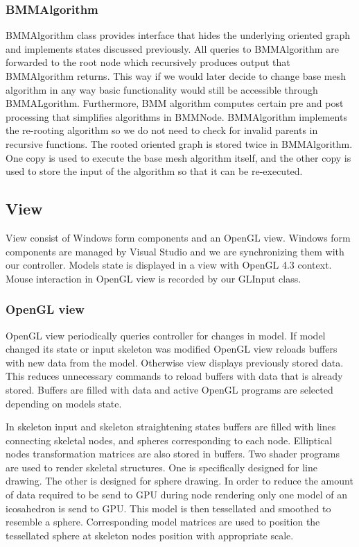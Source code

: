 \subsubsection{BMMAlgorithm}

BMMAlgorithm class provides interface that hides the underlying oriented graph and implements states discussed previously.
All queries to BMMAlgorithm are forwarded to the root node which recursively produces output that BMMAlgorithm returns.
This way if we would later decide to change base mesh algorithm in any way basic functionality would still be accessible through BMMALgorithm.
Furthermore, BMM algorithm computes certain pre and post processing that simplifies algorithms in BMMNode.
BMMAlgorithm implements the re-rooting algorithm so we do not need to check for invalid parents in recursive functions.
The rooted oriented graph is stored twice in BMMAlgorithm.
One copy is used to execute the base mesh algorithm itself, and the other copy is used to store the input of the algorithm so that it can be re-executed.

\subsection{View}

View consist of Windows form components and an OpenGL view.
Windows form components are managed by Visual Studio and we are synchronizing them with our controller.
Models state is displayed in a view with OpenGL 4.3 context.
Mouse interaction in OpenGL view is recorded by our GLInput class.

\subsubsection{OpenGL view}

OpenGL view periodically queries controller for changes in model.
If model changed its state or input skeleton was modified OpenGL view reloads buffers with new data from the model.
Otherwise view displays previously stored data.
This reduces unnecessary commands to reload buffers with data that is already stored.
Buffers are filled with data and active OpenGL programs are selected depending on models state.

In skeleton input and skeleton straightening states buffers are filled with lines connecting skeletal nodes, and spheres corresponding to each node.
Elliptical nodes transformation matrices are also stored in buffers.
Two shader programs are used to render skeletal structures.
One is specifically designed for line drawing.
The other is designed for sphere drawing.
In order to reduce the amount of data required to be send to GPU during node rendering only one model of an icosahedron is send to GPU.
This model is then tessellated and smoothed to resemble a sphere.
Corresponding model matrices are used to position the tessellated sphere at skeleton nodes position with appropriate scale.

